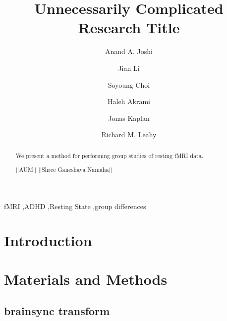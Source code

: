 \documentclass[preprint,12pt]{elsarticle}
\begin{document}
\begin{frontmatter}
\title{Unnecessarily Complicated Research Title}




\author[usc]{Anand A. Joshi}
\author[usc]{Jian Li}
\author[usc]{Soyoung Choi}
\author[usc]{Haleh Akrami}
\author[usc]{Jonas Kaplan}
\author[usc]{Richard M. Leahy}

\address[usc]{University of Southern California, Los Angeles, USA}

\begin{abstract}
We present a method for performing group studies of resting fMRI data.

||AUM||
||Shree Ganeshaya Namaha||

\end{abstract}

\begin{keyword}
fMRI \sep ADHD \sep Resting State \sep group differences
\end{keyword}

\end{frontmatter}
\linenumbers


\section{Introduction}
\label{sec:introduction}

\section{Materials and Methods}
\label{sec:mat_methods}
\subsection{brainsync transform}
\end{document}
